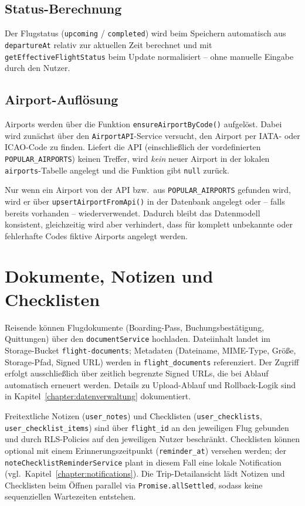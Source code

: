 \subsection{Status-Berechnung}

Der Flugstatus (\texttt{upcoming} / \texttt{completed}) wird beim Speichern automatisch aus
\texttt{departureAt} relativ zur aktuellen Zeit berechnet und mit \texttt{getEffectiveFlightStatus}
beim Update normalisiert -- ohne manuelle Eingabe durch den Nutzer.

\subsection{Airport-Auflösung}

Airports werden über die Funktion \texttt{ensureAirportByCode()} aufgelöst. Dabei wird
zunächst über den \texttt{AirportAPI}-Service versucht, den Airport per IATA- oder
ICAO-Code zu finden. Liefert die API (einschließlich der vordefinierten
\texttt{POPULAR\_AIRPORTS}) keinen Treffer, wird \emph{kein} neuer Airport in der
lokalen \texttt{airports}-Tabelle angelegt und die Funktion gibt \texttt{null} zurück.

Nur wenn ein Airport von der API bzw.\ aus \texttt{POPULAR\_AIRPORTS} gefunden wird,
wird er über \texttt{upsertAirportFromApi()} in der Datenbank angelegt oder -- falls
bereits vorhanden -- wiederverwendet. Dadurch bleibt das Datenmodell konsistent,
gleichzeitig wird aber verhindert, dass für komplett unbekannte oder fehlerhafte
Codes fiktive Airports angelegt werden.

\section{Dokumente, Notizen und Checklisten}

Reisende können Flugdokumente (Boarding-Pass, Buchungsbestätigung, Quittungen) über
den \texttt{documentService} hochladen. Dateiinhalt landet im Storage-Bucket
\texttt{flight-documents}; Metadaten (Dateiname, MIME-Type, Größe, Storage-Pfad,
Signed URL) werden in \texttt{flight\_documents} referenziert. Der Zugriff erfolgt
ausschließlich über zeitlich begrenzte Signed URLs, die bei Ablauf automatisch
erneuert werden. Details zu Upload-Ablauf und Rollback-Logik sind in Kapitel~\ref{chapter:datenverwaltung}
dokumentiert.

Freitextliche Notizen (\texttt{user\_notes}) und Checklisten (\texttt{user\_checklists},
\texttt{user\_checklist\_items}) sind über \texttt{flight\_id} an den jeweiligen Flug gebunden und
durch RLS-Policies auf den jeweiligen Nutzer beschränkt. Checklisten können optional
mit einem Erinnerungszeitpunkt (\texttt{reminder\_at}) versehen werden; der
\texttt{noteChecklistReminderService} plant in diesem Fall eine lokale Notification (vgl.\
Kapitel~\ref{chapter:notifications}). Die Trip-Detailansicht lädt Notizen und Checklisten beim Öffnen parallel
via \texttt{Promise.allSettled}, sodass keine sequenziellen Wartezeiten entstehen.

